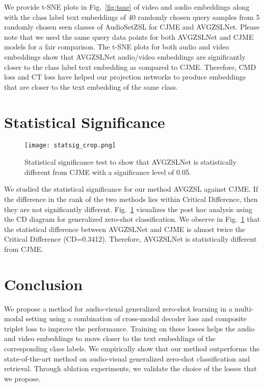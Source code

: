 \documentclass[10pt,twocolumn,letterpaper]{article}
\begin{document}
We provide t-SNE plots in Fig.~\ref{fig:tsne} of video and audio embeddings along with the class label text embeddings of 40 randomly chosen query samples from 5 randomly chosen seen classes of AudioSetZSL for CJME and AVGZSLNet. Please note that we used the same query data points for both AVGZSLNet and CJME models for a fair comparison. The t-SNE plots for both audio and video embeddings show that AVGZSLNet audio/video embeddings are significantly closer to the class label text embedding as compared to CJME. Therefore, CMD loss and CT loss have helped our projection networks to produce embeddings that are closer to the text embedding of the same class.


\section{Statistical Significance}
\begin{figure}[t]
  \centering
  \texttt{[image: statsig\_crop.png]}
\caption{Statistical significance test to show that AVGZSLNet is statistically different from CJME with a significance level of 0.05.}
\label{fig:statsig}
  \vspace{-15pt}
\end{figure}

We studied the statistical significance \cite{demvsar2006statistical} for our method AVGZSL against CJME. If the difference in the rank of the two methods lies within Critical Difference, then they are not significantly different. Fig.~\ref{fig:statsig} visualizes the post hoc analysis using the CD diagram for generalized zero-shot classification. We observe in Fig.~\ref{fig:statsig} that the statistical difference between AVGZSLNet and CJME is almost twice the Critical Difference (CD=0.3412). Therefore, AVGZSLNet is statistically different from CJME. 

\section{Conclusion}
We propose a method for audio-visual generalized zero-shot learning in a multi-modal setting using a combination of cross-modal decoder loss and composite triplet loss to improve the performance. Training on these losses helps the audio and video embeddings to move closer to the text embeddings of the corresponding class labels. We empirically show that our method outperforms the state-of-the-art method on audio-visual generalized zero-shot classification and retrieval. Through ablation experiments, we validate the choice of the losses that we propose.

{\small


}
\end{document}
